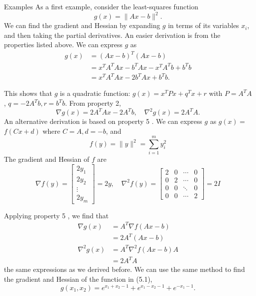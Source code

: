 \begin{example}
    Examples As a first example, consider the least-squares function
$$
g(x)=\|A x-b\|^{2} .
$$
We can find the gradient and Hessian by expanding $ g $ in terms of its variables $ x_{i} $, and then taking the partial derivatives. An easier derivation is from the properties listed above. We can express $ g $ as
$$
\begin{aligned}
g(x) &=(A x-b)^{T}(A x-b) \\
&=x^{T} A^{T} A x-b^{T} A x-x^{T} A^{T} b+b^{T} b \\
&=x^{T} A^{T} A x-2 b^{T} A x+b^{T} b .
\end{aligned}
$$

This shows that $ g $ is a quadratic function: $ g(x)=x^{T} P x+q^{T} x+r $ with $ P=A^{T} A $, $ q=-2 A^{T} b, r=b^{T} b . $ From property 2,
$$
\nabla g(x)=2 A^{T} A x-2 A^{T} b, \quad \nabla^{2} g(x)=2 A^{T} A .
$$
An alternative derivation is based on property 5 . We can express $ g $ as $ g(x)= $ $ f(C x+d) $ where $ C=A, d=-b $, and
$$
f(y)=\|y\|^{2}=\sum_{i=1}^{m} y_{i}^{2}
$$
The gradient and Hessian of $ f $ are
$$
\nabla f(y)=\left[\begin{array}{c}
2 y_{1} \\
2 y_{2} \\
\vdots \\
2 y_{m}
\end{array}\right]=2 y, \quad \nabla^{2} f(y)=\left[\begin{array}{cccc}
2 & 0 & \cdots & 0 \\
0 & 2 & \cdots & 0 \\
0 & 0 & \ddots & 0 \\
0 & 0 & \cdots & 2
\end{array}\right]=2 I
$$

Applying property 5 , we find that
$$
\begin{aligned}
\nabla g(x) &=A^{T} \nabla f(A x-b) \\
&=2 A^{T}(A x-b) \\
\nabla^{2} g(x) &=A^{T} \nabla^{2} f(A x-b) A \\
&=2 A^{T} A
\end{aligned}
$$
the same expressions as we derived before.
We can use the same method to find the gradient and Hessian of the function in (5.1),
$$
g\left(x_{1}, x_{2}\right)=e^{x_{1}+x_{2}-1}+e^{x_{1}-x_{2}-1}+e^{-x_{1}-1} .
$$


\end{example}
